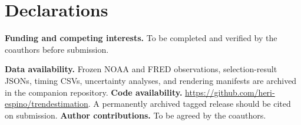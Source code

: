\documentclass[pdflatex,sn-mathphys-ay]{sn-jnl}
\begin{document}
\section*{Declarations}
\noindent\textbf{Funding and competing interests.}
To be completed and verified by the coauthors before submission.

\noindent\textbf{Data availability.}
Frozen NOAA and FRED observations, selection-result JSONs,
timing CSVs, uncertainty analyses, and rendering manifests
are archived in the companion repository.
\noindent\textbf{Code availability.}
\url{https://github.com/heri-espino/trendestimation}.
A permanently archived tagged release should be cited on submission.
\noindent\textbf{Author contributions.}
To be agreed by the coauthors.

\end{document}

